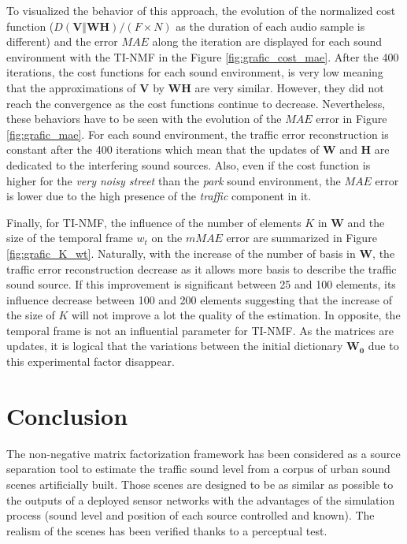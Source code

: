 \documentclass[review,5p,twocolumn,sort&compress,times]{elsarticle}
\begin{document}
To visualized the behavior of this approach, the evolution of the normalized cost function ($D(\mathbf{V}\Vert \mathbf{WH})/(F\times N)$ as the duration of each audio sample is different) and the error $MAE$ along the iteration are displayed for each sound environment with the TI-NMF in the Figure \ref{fig:grafic_cost_mae}. After the 400 iterations, the cost functions for each sound environment, is very low meaning that the approximations of $\mathbf{V}$ by $\mathbf{WH}$ are very similar. However, they did not reach the convergence as the cost functions continue to decrease. Nevertheless, these behaviors have to be seen with the evolution of the $MAE$ error in Figure \ref{fig:grafic_mae}. For each sound environment, the traffic error reconstruction is constant after the 400 iterations which mean that the updates of $\mathbf{W}$ and $\mathbf{H}$ are dedicated to the interfering sound sources. Also, even if the cost function is higher for the \textit{very noisy street} than the \textit{park} sound environment, the $MAE$ error is lower due to the high presence of the \textit{traffic} component in it.


Finally, for TI-NMF, the influence of the number of elements $K$ in $\mathbf{W}$ and the size of the temporal frame $w_t$ on the $mMAE$ error are summarized in Figure \ref{fig:grafic_K_wt}. 
Naturally, with the increase of the number of basis in $\mathbf{W}$, the traffic error reconstruction decrease as it allows more basis to describe the traffic sound source. If this improvement is significant between 25 and 100 elements, its influence decrease between 100 and 200 elements suggesting that the increase of the size of $K$ will not improve a lot the quality of the estimation. In opposite, the temporal frame is not an influential  parameter for TI-NMF. As the matrices are updates, it is logical that the variations between the initial dictionary $\mathbf{W_0}$ due to this experimental factor disappear.

\section{Conclusion}

The non-negative matrix factorization framework has been considered as a source separation tool to estimate the traffic sound level  from a corpus of urban sound scenes artificially built. Those scenes are designed to be as similar as possible to the outputs of a deployed sensor networks with the advantages of the simulation process (sound level and position of each source controlled and known). The realism of the scenes has been verified thanks to a perceptual test.
\end{document}
